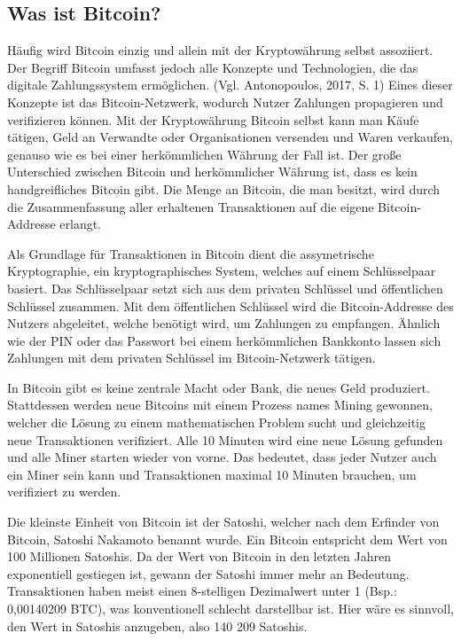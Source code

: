 \subsection{Was ist Bitcoin?}
Häufig wird Bitcoin einzig und allein mit der Kryptowährung selbst assoziiert. Der Begriff Bitcoin umfasst jedoch alle 
Konzepte und Technologien, die das digitale Zahlungssystem ermöglichen. (Vgl. Antonopoulos, 2017, S. 1) Eines dieser Konzepte ist das Bitcoin-Netzwerk, wodurch
Nutzer Zahlungen propagieren und verifizieren können. Mit der Kryptowährung Bitcoin selbst kann man Käufe tätigen, Geld an 
Verwandte oder Organisationen versenden und Waren verkaufen, genauso wie es bei einer herkömmlichen Währung der Fall ist. Der 
große Unterschied zwischen Bitcoin und herkömmlicher Währung ist, dass es kein handgreifliches Bitcoin gibt. Die Menge an 
Bitcoin, die man besitzt, wird durch die Zusammenfassung aller erhaltenen Transaktionen auf die eigene Bitcoin-Addresse erlangt. 

Als Grundlage für Transaktionen in Bitcoin dient die assymetrische Kryptographie, ein kryptographisches System, welches auf
einem Schlüsselpaar basiert. Das Schlüsselpaar setzt sich aus dem privaten Schlüssel und öffentlichen Schlüssel zusammen. Mit 
dem öffentlichen Schlüssel wird die Bitcoin-Addresse des Nutzers abgeleitet, welche benötigt wird, um Zahlungen zu empfangen. 
Ähnlich wie der PIN oder das Passwort bei einem herkömmlichen Bankkonto lassen sich Zahlungen mit dem privaten Schlüssel 
im Bitcoin-Netzwerk tätigen.

In Bitcoin gibt es keine zentrale Macht oder Bank, die neues Geld produziert. Stattdessen werden neue Bitcoins mit einem Prozess
names Mining gewonnen, welcher die Lösung zu einem mathematischen Problem sucht und gleichzeitig neue Transaktionen verifiziert.
Alle 10 Minuten wird eine neue Lösung gefunden und alle Miner starten wieder von vorne. Das bedeutet, dass jeder Nutzer auch ein
Miner sein kann und Transaktionen maximal 10 Minuten brauchen, um verifiziert zu werden.

Die kleinste Einheit von Bitcoin ist der Satoshi, welcher nach dem Erfinder von Bitcoin, Satoshi Nakamoto benannt wurde. Ein 
Bitcoin entspricht dem Wert von 100 Millionen Satoshis. Da der Wert von Bitcoin in den letzten Jahren exponentiell gestiegen ist,
gewann der Satoshi immer mehr an Bedeutung. Transaktionen haben meist einen 8-stelligen Dezimalwert unter 1 (Bsp.: 0,00140209 BTC),
was konventionell schlecht darstellbar ist. Hier wäre es sinnvoll, den Wert in Satoshis anzugeben, also 140 209 Satoshis.


